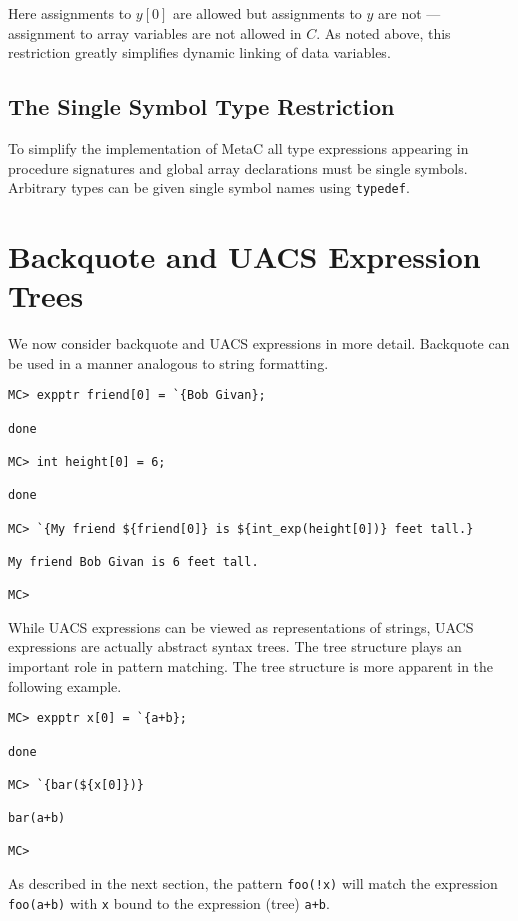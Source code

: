 \documentclass{article}
\begin{document}
Here assignments to $y[0]$ are allowed but assignments to $y$ are not --- assignment to array variables
are not allowed in $C$. As noted above, this restriction greatly simplifies dynamic linking of data variables.

\subsection{The Single Symbol Type Restriction}

To simplify the implementation of MetaC all type expressions appearing in procedure signatures and global array declarations must be single symbols.
Arbitrary types can be given single symbol names using {\tt typedef}.

\section{Backquote and UACS Expression Trees}

We now consider backquote and UACS expressions in more detail.  Backquote can be used in a manner analogous to string formatting.

\begin{verbatim}
MC> expptr friend[0] = `{Bob Givan};

done

MC> int height[0] = 6;

done

MC> `{My friend ${friend[0]} is ${int_exp(height[0])} feet tall.}

My friend Bob Givan is 6 feet tall.

MC> 
\end{verbatim}

While UACS expressions can be viewed as representations of strings, UACS
expressions are actually abstract syntax trees. The tree structure
plays an important role in pattern matching. The tree structure is
more apparent in the following example.

\begin{verbatim}
MC> expptr x[0] = `{a+b};

done

MC> `{bar(${x[0]})}

bar(a+b)

MC>
\end{verbatim}

As described in the next section, the pattern {\tt foo(!x)} will match the expression {\tt foo(a+b)} with {\tt x} bound to the expression (tree) {\tt a+b}.
\end{document}

